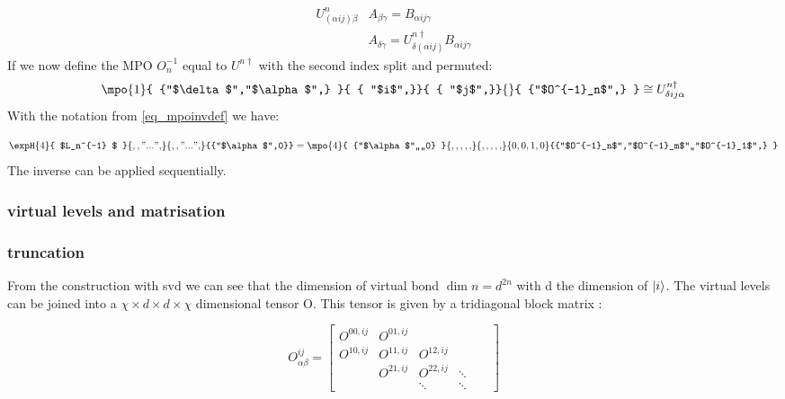 \begin{equation}
    \begin{split}
        U^n_{(\alpha i j) \beta} & A_{\beta \gamma} = B_{\alpha i j \gamma} \\
        &A_{\delta \gamma} =   U^{ n\dagger}_{\delta (\alpha i j)} B_{\alpha i j \gamma}
    \end{split}
\end{equation}
If we now define the MPO $O^{-1}_n$ equal to $U^{n \dagger}$ with the second index split and permuted:
\begin{equation}
    \mpo{1}{ {"$\delta$","$\alpha$",}  }{ { "$i$",}}{ { "$j$",}}{}{ {"$O^{-1}_n$",} } \cong U^{n \dagger}_{\delta i j \alpha}
\end{equation}
With the notation from \cref{eq_mpoinvdef} we have:
\def \OnBlock {\expH{4}{ $L_n^{-1} $  }{ {,,"...",} }{ {,,"...",} }{{"$\alpha$",0}} }

\begin{equation}
    \OnBlock =  \mpo{4}{ {"$\alpha$",,,,0}  }{ {,,,,,}}{ { ,,,,,}}{{0,0,1,0}}{{"$O^{-1}_n$","$O^{-1}_m$",,"$O^{-1}_1$",} }
\end{equation}
The inverse can be applied sequentially.


\subsubsection{virtual levels and matrisation}
\subsubsection{truncation}


From the construction with svd we can see that the dimension of virtual bond $\dim{n} = d^{2 n}$ with d the dimension of $\ket{i}$. The virtual levels can be joined into a $\chi \times d \times d \times \chi$ dimensional tensor O. This tensor is given by a tridiagonal block matrix :

\begin{equation}
    O^{ij}_{\alpha \beta} = \begin{bmatrix}
        O^{00,ij} & O^{01,ij} &           &        &     \\
        O^{10,ij} & O^{11,ij} & O^{12,ij} &              \\
                  & O^{21,ij} & O^{22,ij} & \ddots       \\
                  &           & \ddots    & \ddots &   &
    \end{bmatrix}
\end{equation}


